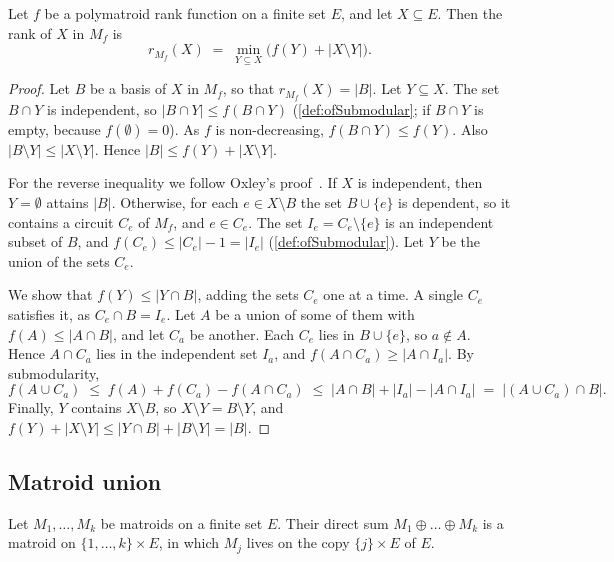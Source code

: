 \begin{lemma}
  \label{lem:polymatroid-rank}
  \leanok
  Let $f$ be a polymatroid rank function on a finite set $E$, and let
  $X \subseteq E$. Then the rank of $X$ in $M_f$ is
  \[
    r_{M_f}(X) \;=\; \min_{Y \subseteq X}\bigl(f(Y) + |X \setminus Y|\bigr).
  \]
\end{lemma}
\begin{proof}
  \leanok
  Let $B$ be a basis of $X$ in $M_f$, so that $r_{M_f}(X) = |B|$. Let
  $Y \subseteq X$. The set $B \cap Y$ is independent, so
  $|B \cap Y| \le f(B \cap Y)$ (\cref{def:ofSubmodular}; if
  $B \cap Y$ is empty, because $f(\emptyset) = 0$). As $f$ is
  non-decreasing, $f(B \cap Y) \le f(Y)$. Also
  $|B \setminus Y| \le |X \setminus Y|$. Hence
  $|B| \le f(Y) + |X \setminus Y|$.

  For the reverse inequality we follow Oxley's
  proof~\cite[Proposition~11.1.7]{oxley2011}. If $X$ is independent,
  then $Y = \emptyset$ attains $|B|$. Otherwise, for each
  $e \in X \setminus B$ the set $B \cup \{e\}$ is dependent, so it
  contains a circuit $C_e$ of $M_f$, and $e \in C_e$. The set
  $I_e = C_e \setminus \{e\}$ is an independent subset of $B$, and
  $f(C_e) \le |C_e| - 1 = |I_e|$ (\cref{def:ofSubmodular}). Let $Y$ be
  the union of the sets $C_e$.

  We show that $f(Y) \le |Y \cap B|$, adding the sets $C_e$ one at a
  time. A single $C_e$ satisfies it, as $C_e \cap B = I_e$. Let $A$ be a
  union of some of them with $f(A) \le |A \cap B|$, and let $C_a$ be
  another. Each $C_e$ lies in $B \cup \{e\}$, so $a \notin A$. Hence
  $A \cap C_a$ lies in the independent set $I_a$, and
  $f(A \cap C_a) \ge |A \cap I_a|$. By submodularity,
  \[
    f(A \cup C_a) \;\le\; f(A) + f(C_a) - f(A \cap C_a)
    \;\le\; |A \cap B| + |I_a| - |A \cap I_a|
    \;=\; |(A \cup C_a) \cap B|.
  \]
  Finally, $Y$ contains $X \setminus B$, so
  $X \setminus Y = B \setminus Y$, and
  $f(Y) + |X \setminus Y| \le |Y \cap B| + |B \setminus Y| = |B|$.
\end{proof}

\subsection{Matroid union}
\label{sec:matroid-union-union}

Let $M_1, \dots, M_k$ be matroids on a finite set $E$. Their direct
sum $M_1 \oplus \dots \oplus M_k$ is a matroid on
$\{1, \dots, k\} \times E$, in which $M_j$ lives on the copy
$\{j\} \times E$ of $E$.

